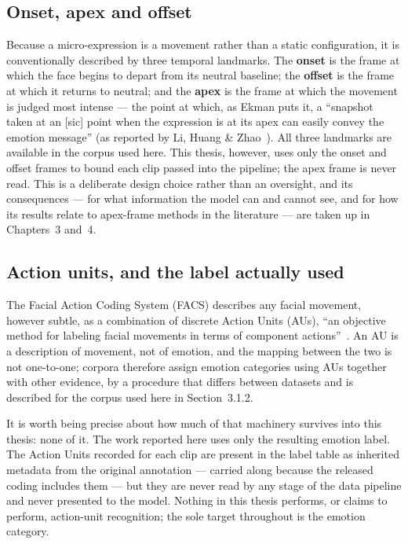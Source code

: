 \subsection{Onset, apex and offset}
\label{sec:onset-apex-offset}

Because a micro-expression is a movement rather than a static configuration, it is conventionally described by three temporal landmarks. The \textbf{onset} is the frame at which the face begins to depart from its neutral baseline; the \textbf{offset} is the frame at which it returns to neutral; and the \textbf{apex} is the frame at which the movement is judged most intense --- the point at which, as Ekman puts it, a ``snapshot taken at an [sic] point when the expression is at its apex can easily convey the emotion message'' (as reported by Li, Huang \& Zhao~\cite{liY2018}). All three landmarks are available in the corpus used here. This thesis, however, uses only the onset and offset frames to bound each clip passed into the pipeline; the apex frame is never read. This is a deliberate design choice rather than an oversight, and its consequences --- for what information the model can and cannot see, and for how its results relate to apex-frame methods in the literature --- are taken up in Chapters~3 and~4.

\subsection{Action units, and the label actually used}
\label{sec:action-units}

The Facial Action Coding System (FACS) describes any facial movement, however subtle, as a combination of discrete Action Units (AUs), ``an objective method for labeling facial movements in terms of component actions''~\cite{yan2014}. An AU is a description of movement, not of emotion, and the mapping between the two is not one-to-one; corpora therefore assign emotion categories using AUs together with other evidence, by a procedure that differs between datasets and is described for the corpus used here in Section~3.1.2.

It is worth being precise about how much of that machinery survives into this thesis: none of it. The work reported here uses only the resulting emotion label. The Action Units recorded for each clip are present in the label table as inherited metadata from the original annotation --- carried along because the released coding includes them --- but they are never read by any stage of the data pipeline and never presented to the model. Nothing in this thesis performs, or claims to perform, action-unit recognition; the sole target throughout is the emotion category.

